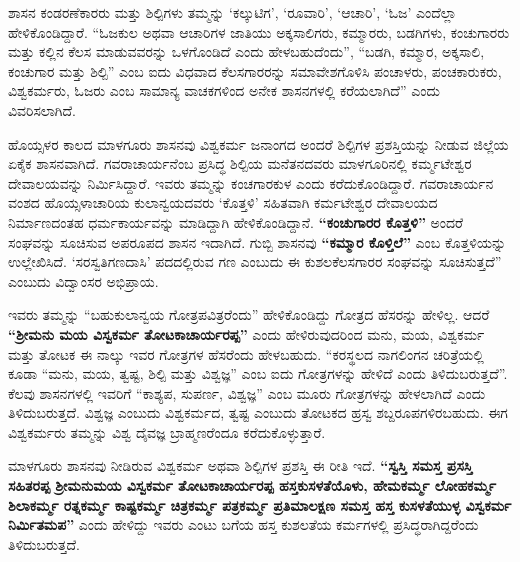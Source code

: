 \vskip 3pt

ಶಾಸನ ಕಂಡರಣೆಕಾರರು ಮತ್ತು ಶಿಲ್ಪಿಗಳು ತಮ್ಮನ್ನು ‘ಕಲ್ಕುಟಿಗ’, ‘ರೂವಾರಿ’, ‘ಆಚಾರಿ’, ‘ಓಜ’ ಎಂದೆಲ್ಲಾ ಹೇಳಿಕೊಂಡಿದ್ದಾರೆ. “ಓಜಕುಲ ಅಥವಾ ಆಚಾರಿಗಳ ಜಾತಿಯು ಅಕ್ಕಸಾಲಿಗರು, ಕಮ್ಮಾರರು, ಬಡಗಿಗಳು, ಕಂಚುಗಾರರು ಮತ್ತು ಕಲ್ಲಿನ ಕೆಲಸ ಮಾಡುವವರನ್ನು ಒಳಗೊಂಡಿದೆ ಎಂದು ಹೇಳಬಹುದೆಂದು”, “ಬಡಗಿ, ಕಮ್ಮಾರ, ಅಕ್ಕಸಾಲಿ, ಕಂಚುಗಾರ ಮತ್ತು ಶಿಲ್ಪಿ” ಎಂಬ ಐದು ವಿಧವಾದ ಕೆಲಸಗಾರರನ್ನು ಸಮಾವೇಶಗೊಳಿಸಿ ಪಂಚಾಳರು, ಪಂಚಕಾರುಕರು, ವಿಶ್ವಕರ್ಮರು, ಓಜರು ಎಂಬ ಸಾಮಾನ್ಯ ವಾಚಕಗಳಿಂದ ಅನೇಕ ಶಾಸನಗಳಲ್ಲಿ ಕರೆಯಲಾಗಿದೆ” ಎಂದು ವಿವರಿಸಲಾಗಿದೆ.

\vskip 3pt

ಹೊಯ್ಸಳರ ಕಾಲದ ಮಾಳಗೂರು ಶಾಸನವು ವಿಶ್ವಕರ್ಮ ಜನಾಂಗದ ಅಂದರೆ ಶಿಲ್ಪಿಗಳ ಪ್ರಶಸ್ತಿಯನ್ನು ನೀಡುವ ಜಿಲ್ಲೆಯ ಏಕೈಕ ಶಾಸನವಾಗಿದೆ. ಗವರಾಚಾರ್ಯನೆಂಬ ಪ್ರಸಿದ್ಧ ಶಿಲ್ಪಿಯ ಮನೆತನದವರು ಮಾಳಗೂರಿನಲ್ಲಿ ಕರ್ಮ್ಮಟೇಶ್ವರ ದೇವಾಲಯವನ್ನು ನಿರ್ಮಿಸಿದ್ದಾರೆ. ಇವರು ತಮ್ಮನ್ನು ಕಂಚಗಾರಕುಳ ಎಂದು ಕರೆದುಕೊಂಡಿದ್ದಾರೆ. ಗವರಾಚಾರ್ಯನ ವಂಶದ ಹೊಯ್ಸಳಾಚಾರಿಯ ಕುಲಾನ್ವಯದವರು ‘ಕೊತ್ತಳಿ’ ಸಹಿತವಾಗಿ ಕರ್ಮಟೇಶ್ವರ ದೇವಾಲಯದ ನಿರ್ಮಾಣದಂತಹ ಧರ್ಮಕಾರ್ಯವನ್ನು ಮಾಡಿದ್ದಾಗಿ ಹೇಳಿಕೊಂಡಿದ್ದಾನೆ.\textbf{ “ಕಂಚುಗಾರರ ಕೊತ್ತಳಿ”} ಅಂದರೆ ಸಂಘವನ್ನು ಸೂಚಿಸುವ ಅಪರೂಪದ ಶಾಸನ ಇದಾಗಿದೆ. ಗುಬ್ಬಿ ಶಾಸನವು \textbf{“ಕಮ್ಮಾರ ಕೊಳ್ತಿಲೆ”} ಎಂಬ ಕೊತ್ತಳಿಯನ್ನು ಉಲ್ಲೇಖಿಸಿದೆ. ‘ಸರಸ್ವತಿಗಣದಾಸಿ’ ಪದದಲ್ಲಿರುವ ಗಣ ಎಂಬುದು ಈ ಕುಶಲಕೆಲಸಗಾರರ ಸಂಘವನ್ನು ಸೂಚಿಸುತ್ತದೆ” ಎಂಬುದು ವಿದ್ವಾಂಸರ ಅಭಿಪ್ರಾಯ.

\vskip 3pt

ಇವರು ತಮ್ಮನ್ನು “ಬಹುಕುಲಾನ್ವಯ ಗೋತ್ರಪವಿತ್ರರೆಂದು” ಹೇಳಿಕೊಂಡಿದ್ದು ಗೋತ್ರದ ಹೆಸರನ್ನು ಹೇಳಿಲ್ಲ. ಆದರೆ \textbf{“ಶ‍್ರೀಮನು ಮಯ ವಿಸ್ವಕರ್ಮ ತೋಟಕಾಚಾರ್ಯರಪ್ಪ”} ಎಂದು ಹೇಳಿರುವುದರಿಂದ ಮನು, ಮಯ, ವಿಶ್ವಕರ್ಮ ಮತ್ತು ತೋಟಕ ಈ ನಾಲ್ಕು ಇವರ ಗೋತ್ರಗಳ ಹೆಸರೆಂದು ಹೇಳಬಹುದು. “ಕರಸ್ಥಲದ ನಾಗಲಿಂಗನ ಚರಿತ್ರೆಯಲ್ಲಿ ಕೂಡಾ “ಮನು, ಮಯ, ತ್ವಷ್ಟ, ಶಿಲ್ಪಿ ಮತ್ತು ವಿಶ್ವಜ್ಞ” ಎಂಬ ಐದು ಗೋತ್ರಗಳನ್ನು ಹೇಳಿದೆ ಎಂದು ತಿಳಿದುಬರುತ್ತದೆ”. ಕೆಲವು ಶಾಸನಗಳಲ್ಲಿ ಇವರಿಗೆ “ಕಾಶ್ಯಪ, ಸುಪರ್ಣ, ವಿಶ್ವಜ್ಞ” ಎಂಬ ಮೂರು ಗೋತ್ರಗಳನ್ನು ಹೇಳಲಾಗಿದೆ ಎಂದು ತಿಳಿದುಬರುತ್ತದೆ. ವಿಶ್ವಜ್ಞ ಎಂಬುದು ವಿಶ್ವಕರ್ಮದ, ತ್ವಷ್ಟ ಎಂಬುದು ತೋಟಕದ ಹ್ರಸ್ವ ಶಬ್ದರೂಪಗಳಿರಬಹುದು. ಈಗ ವಿಶ್ವಕರ್ಮರು ತಮ್ಮನ್ನು ವಿಶ್ವ ದೈವಜ್ಞ ಬ್ರಾಹ್ಮಣರೆಂದೂ ಕರೆದುಕೊಳ್ಳುತ್ತಾರೆ.

ಮಾಳಗೂರು ಶಾಸನವು ನೀಡಿರುವ ವಿಶ್ವಕರ್ಮ ಅಥವಾ ಶಿಲ್ಪಿಗಳ ಪ್ರಶಸ್ತಿ ಈ ರೀತಿ ಇದೆ. \textbf{“ಸ್ವಸ್ತಿ ಸಮಸ್ತ ಪ್ರಸಸ್ತಿ ಸಹಿತರಪ್ಪ ಶ‍್ರೀಮನುಮಯ ವಿಸ್ವಕರ್ಮ ತೋಟಕಾಚಾರ್ಯರಪ್ಪ ಹಸ್ತಕುಸಳತೆಯೊಳು, ಹೇಮಕರ್ಮ್ಮ ಲೋಹಕರ್ಮ್ಮ ಶಿಲಾಕರ್ಮ್ಮ ರತ್ನಕರ್ಮ್ಮ ಕಾಷ್ಟಕರ್ಮ್ಮ ಚಿತ್ರಕರ್ಮ್ಮ ಪತ್ರಕರ್ಮ್ಮ ಪ್ರತಿಮಾಲಕ್ಷಣ ಸಮಸ್ತ ಹಸ್ತ ಕುಸಳತೆಯುಳ್ಳ ವಿಸ್ವಕರ್ಮ ನಿರ್ಮಿತಮಪ”} ಎಂದು ಹೇಳಿದ್ದು ಇವರು ಎಂಟು ಬಗೆಯ ಹಸ್ತ ಕುಶಲತೆಯ ಕರ್ಮಗಳಲ್ಲಿ ಪ್ರಸಿದ್ಧರಾಗಿದ್ದರೆಂದು ತಿಳಿದು\break ಬರುತ್ತದೆ.


